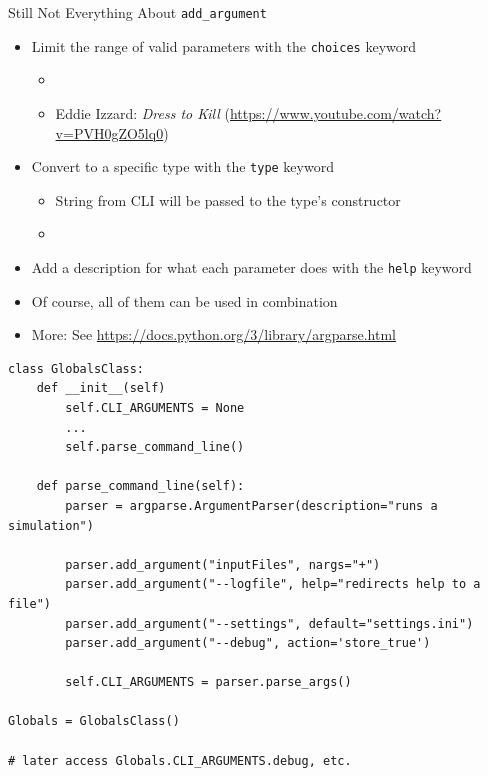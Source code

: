 \begin{frame}[fragile]{Still Not Everything About \texttt{add\_argument}}
%
\begin{itemize}
\item Limit the range of valid parameters with the \texttt{choices} keyword
	\begin{itemize}
	\item {}
	\item Eddie Izzard: \emph{Dress to Kill} (\url{https://www.youtube.com/watch?v=PVH0gZO5lq0})
	\end{itemize}
\item Convert to a specific type with the \texttt{type} keyword
	\begin{itemize}
	\item String from CLI will be passed to the type's constructor
	\item {}
	\end{itemize}
\item Add a description for what each parameter does with the \texttt{help} keyword
\item Of course, all of them can be used in combination
\item More: See \url{https://docs.python.org/3/library/argparse.html}
\end{itemize}
%
\end{frame}


\begin{frame}[fragile]
%
\begin{codebox}[Globals.py]
\begin{verbatim}
class GlobalsClass:
    def __init__(self)
        self.CLI_ARGUMENTS = None
        ...
        self.parse_command_line()

    def parse_command_line(self):
        parser = argparse.ArgumentParser(description="runs a simulation")

        parser.add_argument("inputFiles", nargs="+")
        parser.add_argument("--logfile", help="redirects help to a file")
        parser.add_argument("--settings", default="settings.ini")
        parser.add_argument("--debug", action='store_true')

        self.CLI_ARGUMENTS = parser.parse_args()

Globals = GlobalsClass()

# later access Globals.CLI_ARGUMENTS.debug, etc.
\end{verbatim}
\end{codebox}
%
\end{frame}

